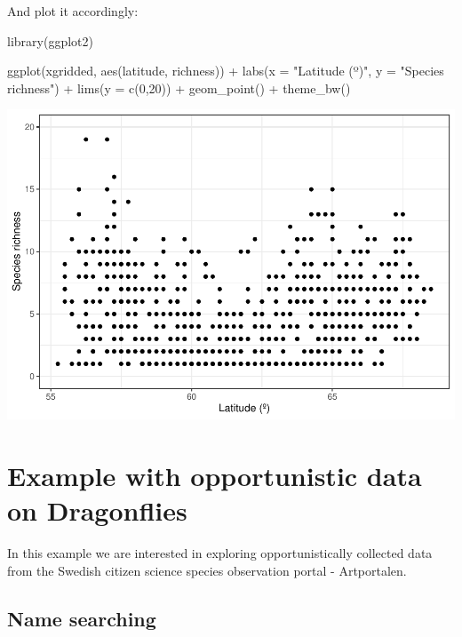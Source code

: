 \documentclass[
  10pt,
]{article}
\newenvironment{Shaded}{\begin{snugshade}}{\end{snugshade}}
\newcommand{\AttributeTok}[1]{\textcolor[rgb]{0.77,0.63,0.00}{#1}}
\newcommand{\DecValTok}[1]{\textcolor[rgb]{0.00,0.00,0.81}{#1}}
\newcommand{\FunctionTok}[1]{\textcolor[rgb]{0.00,0.00,0.00}{#1}}
\newcommand{\NormalTok}[1]{#1}
\newcommand{\SpecialCharTok}[1]{\textcolor[rgb]{0.00,0.00,0.00}{#1}}
\newcommand{\StringTok}[1]{\textcolor[rgb]{0.31,0.60,0.02}{#1}}
\begin{document}
And plot it accordingly:

\begin{Shaded}
\begin{Highlighting}[]
\FunctionTok{library}\NormalTok{(ggplot2)}

\FunctionTok{ggplot}\NormalTok{(xgridded, }\FunctionTok{aes}\NormalTok{(latitude, richness)) }\SpecialCharTok{+} 
  \FunctionTok{labs}\NormalTok{(}\AttributeTok{x =} \StringTok{"Latitude (º)"}\NormalTok{, }
       \AttributeTok{y =} \StringTok{"Species richness"}\NormalTok{) }\SpecialCharTok{+}
  \FunctionTok{lims}\NormalTok{(}\AttributeTok{y =} \FunctionTok{c}\NormalTok{(}\DecValTok{0}\NormalTok{,}\DecValTok{20}\NormalTok{)) }\SpecialCharTok{+}
  \FunctionTok{geom\_point}\NormalTok{() }\SpecialCharTok{+} 
  \FunctionTok{theme\_bw}\NormalTok{()}
\end{Highlighting}
\end{Shaded}

\includegraphics{r-tools-tutorial_files/figure-latex/plot_richLat-1.pdf}

\hypertarget{example-with-opportunistic-data-on-dragonflies}{%
\section{Example with opportunistic data on Dragonflies}\label{example-with-opportunistic-data-on-dragonflies}}

In this example we are interested in exploring opportunistically
collected data from the Swedish citizen science species observation
portal - Artportalen.

\hypertarget{name-searching}{%
\subsection{Name searching}\label{name-searching}}
\end{document}

